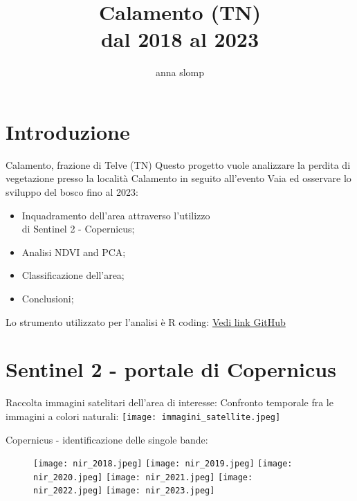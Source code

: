 \documentclass[10pt]{beamer}
\title{Calamento (TN)\\
dal 2018 al 2023}
\author{anna slomp}
\begin{document}
\maketitle


\section{Introduzione}
\begin{frame}{Calamento, frazione di Telve (TN)}
Questo progetto vuole analizzare la perdita di vegetazione presso la località Calamento in seguito all'evento Vaia ed osservare lo sviluppo del bosco fino al 2023:
\begin{itemize}
    \item Inquadramento dell'area attraverso l'utilizzo\\
    di Sentinel 2 - Copernicus;
    \item Analisi NDVI and PCA; 
    \item Classificazione dell'area;
    \item Conclusioni;
\end{itemize}
Lo strumento utilizzato per l'analisi è R coding:
\href{https://github.com/DM001-1/telerilevamento_23_24/blob/main/R_script_exam.R}{Vedi link GitHub}
\end{frame}    

\section{Sentinel 2 - portale di Copernicus}
\begin{frame}{Raccolta immagini satelitari dell'area di interesse:}
Confronto temporale fra le immagini a colori naturali: 
\texttt{[image: immagini\_satellite.jpeg]}
\end{frame}

\begin{frame}{Copernicus - identificazione delle singole bande:}
\begin{figure}
        \centering
        \texttt{[image: nir\_2018.jpeg]}
        \texttt{[image: nir\_2019.jpeg]} 
        \texttt{[image: nir\_2020.jpeg]}
        \texttt{[image: nir\_2021.jpeg]}
        \texttt{[image: nir\_2022.jpeg]} 
        \texttt{[image: nir\_2023.jpeg]}
    \end{figure}
\end{frame}
\end{document}
